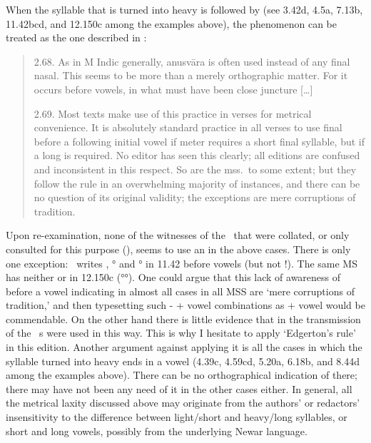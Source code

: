 \noindent
When the syllable that is turned into heavy is followed by 
(see 3.42d, 4.5a, 7.13b, 11.42bcd, and 12.150c among the examples above), 
the phenomenon can be treated as the one described in 
:

\begin{quote}
2.68. As in M Indic generally, anusvāra is often used
instead of any final nasal. This seems to be more than a
merely orthographic matter. For it occurs before vowels,
in what must have been close juncture [\dots] 

2.69. Most texts make use of this practice in verses
for metrical convenience. It is absolutely standard practice
in all verses to use final  before a following initial vowel
if meter requires a short final syllable, but  if a long is
required. No editor has seen this clearly; all editions are
confused and inconsistent in this respect. So are the mss.\ to 
some extent; but they follow the rule in an overwhelming
majority of instances, and there can be no question of its
original validity; the exceptions are mere corruptions of
tradition.
\end{quote}
  
\noindent
Upon re-examination, none of the witnesses of the \VSS\ that were collated, 
or only consulted for this purpose (\msCa\msCb\msCc\allowbreak\msNa\msNb\msNc\msM\msParis\msKOa\msKOb),
seems to use an  in the above cases. There is only one exception:
\msM\ writes , ° 
and ° in 11.42 before vowels (but not
!). The same MS has neither 
 or  in 12.150c (°°).
One could argue that this lack of awareness of  before
a vowel indicating  in almost all cases in all MSS
are `mere corruptions of tradition,' and then typesetting
such - + vowel combinations as  + vowel 
would be commendable.
On the other hand there is little evidence that in the transmission
of the \VSS\ s were used in this way. This is why
I hesitate to apply `Edgerton's rule' in this edition. Another argument
against applying it is all the cases in which the syllable turned into heavy
ends in a vowel (4.39c, 4.59cd, 5.20a, 6.18b, and 8.44d among the
examples above). There can be no orthographical indication of  there;
there may have not been any need of it in the other cases either.
In general, all the metrical laxity discussed above may originate from
the authors' or redactors' insensitivity to the difference between light/short and heavy/long
syllables, or short and long vowels, possibly from the underlying Newar language. 


